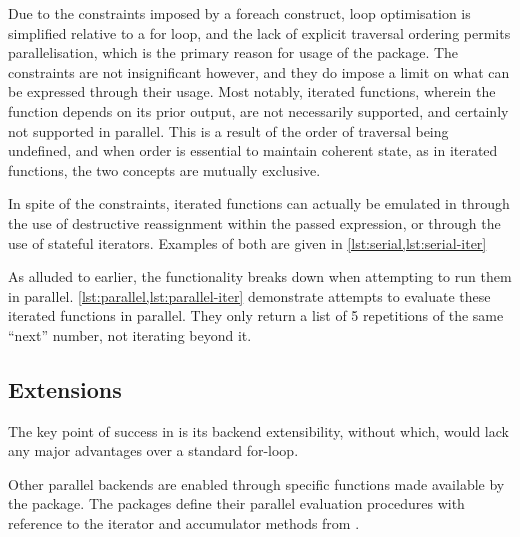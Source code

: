 Due to the constraints imposed by a foreach construct, loop optimisation is simplified relative to a for loop, and the lack of explicit traversal ordering permits parallelisation, which is the primary reason for usage of the  package.
The constraints are not insignificant however, and they do impose a limit on what can be expressed through their usage.
Most notably, iterated functions, wherein the function depends on its prior output, are not necessarily supported, and certainly not supported in parallel.
This is a result of the order of traversal being undefined, and when order is essential to maintain coherent state, as in iterated functions, the two concepts are mutually exclusive.

In spite of the constraints, iterated functions can actually be emulated in  through the use of destructive reassignment within the passed expression, or through the use of stateful iterators.
Examples of both are given in \cref{lst:serial,lst:serial-iter}



As alluded to earlier, the functionality breaks down when attempting to run them in parallel.
\cref{lst:parallel,lst:parallel-iter}
demonstrate attempts to evaluate these iterated functions in parallel.
They only return a list of 5 repetitions of the same ``next'' number, not iterating beyond it.



\subsection{Extensions}\label{subsec:foreach-extensions}

The key point of success in  is its backend extensibility, without which,  would lack any major advantages over a standard for-loop.

Other parallel backends are enabled through specific functions made available by the  package.
The packages define their parallel evaluation procedures with reference to the iterator and accumulator methods from .

